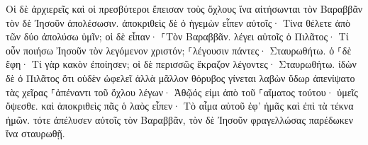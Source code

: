 \documentclass{openreader}
\begin{document}
Οἱ δὲ ἀρχιερεῖς καὶ οἱ πρεσβύτεροι ἔπεισαν τοὺς ὄχλους ἵνα αἰτήσωνται τὸν Βαραββᾶν τὸν δὲ Ἰησοῦν ἀπολέσωσιν. 
ἀποκριθεὶς δὲ ὁ ἡγεμὼν εἶπεν αὐτοῖς· Τίνα θέλετε ἀπὸ τῶν δύο ἀπολύσω ὑμῖν; οἱ δὲ εἶπαν· ⸀Τὸν Βαραββᾶν. 
λέγει αὐτοῖς ὁ Πιλᾶτος· Τί οὖν ποιήσω Ἰησοῦν τὸν λεγόμενον χριστόν; ⸀λέγουσιν πάντες· Σταυρωθήτω. 
ὁ ⸀δὲ ἔφη· Τί γὰρ κακὸν ἐποίησεν; οἱ δὲ περισσῶς ἔκραζον λέγοντες· Σταυρωθήτω. 
ἰδὼν δὲ ὁ Πιλᾶτος ὅτι οὐδὲν ὠφελεῖ ἀλλὰ μᾶλλον θόρυβος γίνεται λαβὼν ὕδωρ ἀπενίψατο τὰς χεῖρας ⸀ἀπέναντι τοῦ ὄχλου λέγων· Ἀθῷός εἰμι ἀπὸ τοῦ ⸀αἵματος τούτου· ὑμεῖς ὄψεσθε. 
καὶ ἀποκριθεὶς πᾶς ὁ λαὸς εἶπεν· Τὸ αἷμα αὐτοῦ ἐφ’ ἡμᾶς καὶ ἐπὶ τὰ τέκνα ἡμῶν. 
τότε ἀπέλυσεν αὐτοῖς τὸν Βαραββᾶν, τὸν δὲ Ἰησοῦν φραγελλώσας παρέδωκεν ἵνα σταυρωθῇ. 
\end{document}
